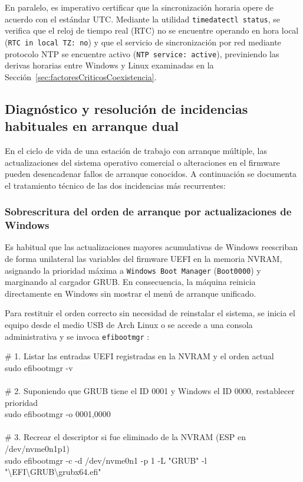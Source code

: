 \documentclass[12pt]{article}
\begin{document}
En paralelo, es imperativo certificar que la sincronización horaria opere de acuerdo con el estándar UTC. Mediante la utilidad \texttt{timedatectl status}, se verifica que el reloj de tiempo real (RTC) no se encuentre operando en hora local (\texttt{RTC in local TZ: no}) y que el servicio de sincronización por red mediante protocolo NTP se encuentre activo (\texttt{NTP service: active}), previniendo las derivas horarias entre Windows y Linux examinadas en la Sección~\ref{sec:factoresCriticosCoexistencia}.

\subsection{Diagnóstico y resolución de incidencias habituales en arranque dual}
\label{sec:resolucionIncidencias}

En el ciclo de vida de una estación de trabajo con arranque múltiple, las actualizaciones del sistema operativo comercial o alteraciones en el firmware pueden desencadenar fallos de arranque conocidos. A continuación se documenta el tratamiento técnico de las dos incidencias más recurrentes:

\subsubsection{Sobrescritura del orden de arranque por actualizaciones de Windows}

Es habitual que las actualizaciones mayores acumulativas de Windows reescriban de forma unilateral las variables del firmware UEFI en la memoria NVRAM, asignando la prioridad máxima a \texttt{Windows Boot Manager} (\texttt{Boot0000}) y marginando al cargador GRUB. En consecuencia, la máquina reinicia directamente en Windows sin mostrar el menú de arranque unificado.

Para restituir el orden correcto sin necesidad de reinstalar el sistema, se inicia el equipo desde el medio USB de Arch Linux o se accede a una consola administrativa y se invoca \texttt{efibootmgr} \parencite{uefi2024specification}:

\begin{mdframed}[style=terminal]
\ttfamily\upshape\color{bashLetterColor}\footnotesize
\# 1. Listar las entradas UEFI registradas en la NVRAM y el orden actual \\
sudo efibootmgr -v \\
\\
\# 2. Suponiendo que GRUB tiene el ID 0001 y Windows el ID 0000, restablecer prioridad \\
sudo efibootmgr -o 0001,0000 \\
\\
\# 3. Recrear el descriptor si fue eliminado de la NVRAM (ESP en /dev/nvme0n1p1) \\
sudo efibootmgr -c -d /dev/nvme0n1 -p 1 -L "GRUB" -l "\textbackslash EFI\textbackslash GRUB\textbackslash grubx64.efi"
\end{mdframed}
\end{document}
